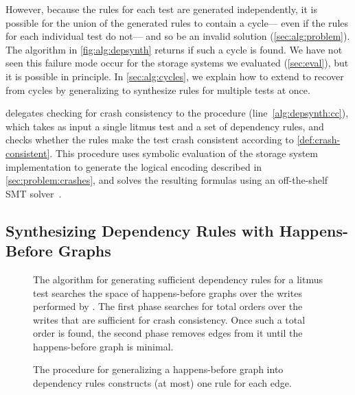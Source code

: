 However, because the rules for each test are generated independently,
it is possible for the union of the generated rules to contain a cycle---%
even if the rules for each individual test do not---%
and so be an invalid solution (\cref{sec:alg:problem}).
The algorithm in \cref{fig:alg:depsynth}
returns \UNKNOWN if such a cycle is found.
We have not seen this failure mode occur for the storage systems we evaluated (\cref{sec:eval}),
but it is possible in principle.
In \cref{sec:alg:cycles}, we explain how to extend \depsynthalg
to recover from cycles by generalizing  to synthesize rules for multiple tests at once.

\depsynthalg delegates checking for crash consistency
to the procedure \crashconsistentalg (line~\ref{alg:depsynth:cc}), 
which takes as input a single litmus test
and a set of dependency rules,
and checks whether the rules make the test crash consistent
according to \cref{def:crash-consistent}.
This procedure uses symbolic evaluation of the storage system implementation \sys
to generate the logical encoding described in \cref{sec:problem:crashes},
and solves the resulting formulas using an off-the-shelf SMT solver~\cite{niemetz:boolector}.\tighten

\subsection{Synthesizing Dependency Rules with Happens-Before Graphs}\label{sec:alg:onetest}

\begin{figure}
    \centering
    {\xsmall}
    \caption{The algorithm for generating sufficient dependency rules for a litmus test \test
    searches the space of happens-before graphs over the writes performed by \test.
    The first phase searches for total orders over the writes that are sufficient for crash consistency.
    Once such a total order is found, the second phase removes edges from it until the happens-before graph is minimal.}
    \label{fig:alg:rulesfortests}
\end{figure}

\begin{figure}
    \centering
    {\xsmall}
    \caption{The procedure for generalizing a happens-before graph \gr into dependency rules
    constructs (at most) one rule for each edge.}
    \label{fig:alg:rulesforgraph}
\end{figure}

